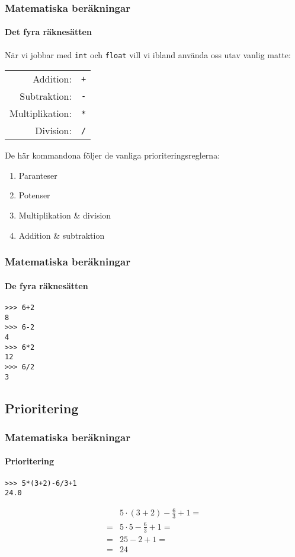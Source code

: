 \documentclass[aspectratio=169]{beamer}
\begin{document}
\begin{frame}
\frametitle{Matematiska beräkningar}
\framesubtitle{Det fyra räknesätten}

När vi jobbar med \texttt{int} och \texttt{float} vill vi ibland använda oss utav vanlig matte:

	\begin{center}
		\begin{tabular}{| rl |}
			\hline
			Addition: 		& \texttt{+}\\
			Subtraktion:	& \texttt{-}\\
			Multiplikation:	& \texttt{*}\\
			Division:		& \texttt{/}\\
			\hline
		\end{tabular}
	\end{center}
	
	De här kommandona följer de vanliga prioriteringsreglerna:
	\begin{enumerate}
		\item Paranteser
		\item Potenser
		\item Multiplikation \& division
		\item Addition \& subtraktion
	\end{enumerate}

\end{frame}

\begin{frame}[fragile]
	\frametitle{Matematiska beräkningar}
	\framesubtitle{De fyra räknesätten}
	
	\begin{lstlisting}
>>> 6+2
8
>>> 6-2
4
>>> 6*2
12
>>> 6/2
3
	\end{lstlisting}

\end{frame}

\subsection{Prioritering}

\begin{frame}[fragile]
	\frametitle{Matematiska beräkningar}
	\framesubtitle{Prioritering}

	\begin{lstlisting}
>>> 5*(3+2)-6/3+1
24.0
	\end{lstlisting} \pause
	
	\[ \begin{aligned}
			& 5\cdot(3+2)-\frac{6}{3}+1 = \\
		= 	& 5 \cdot 5- \frac{6}{3}+1 = \\
		=	& 25-2+1 = \\
		= & 24
	\end{aligned} \]

\end{frame}
\end{document}
